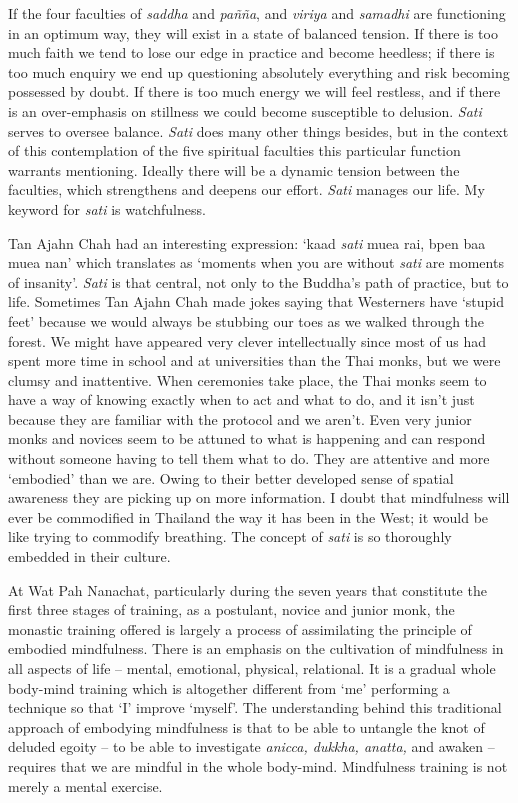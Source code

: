 If the four faculties of \emph{saddha} and \emph{pañña}, and
\emph{viriya} and \emph{samadhi} are functioning in an optimum way, they
will exist in a state of balanced tension. If there is too much faith we
tend to lose our edge in practice and become heedless; if there is too
much enquiry we end up questioning absolutely everything and risk
becoming possessed by doubt. If there is too much energy we will feel
restless, and if there is an over-emphasis on stillness we could become
susceptible to delusion. \emph{Sati} serves to oversee balance.
\emph{Sati} does many other things besides, but in the context of this
contemplation of the five spiritual faculties this particular function
warrants mentioning. Ideally there will be a dynamic tension between the
faculties, which strengthens and deepens our effort. \emph{Sati} manages
our life. My keyword for \emph{sati} is watchfulness.

Tan Ajahn Chah had an interesting expression: `kaad \emph{sati} muea rai,
bpen baa muea nan' which translates as `moments when you are without
\emph{sati} are moments of insanity'. \emph{Sati} is that central, not
only to the Buddha's path of practice, but to life. Sometimes Tan Ajahn
Chah made jokes saying that Westerners have `stupid feet' because we
would always be stubbing our toes as we walked through the forest. We
might have appeared very clever intellectually since most of us had
spent more time in school and at universities than the Thai monks, but
we were clumsy and inattentive.
When ceremonies take place, the Thai monks seem to have a way of knowing exactly
when to act and what to do, and it isn't just because they are familiar with the
protocol and we aren't. Even very junior monks and novices seem to be attuned to
what is happening and can respond without someone having to tell them what to
do. They are attentive and more `embodied' than we are. Owing to their better
developed sense of spatial awareness they are picking up on more information.
I doubt that mindfulness will ever
be commodified in Thailand the way it has been in the West; it would be
like trying to commodify breathing. The concept of \emph{sati} is so
thoroughly embedded in their culture.

At Wat Pah Nanachat, particularly during the seven years that constitute
the first three stages of training, as a postulant, novice and junior
monk, the monastic training offered is largely a process of assimilating
the principle of embodied mindfulness. There is an emphasis on the
cultivation of mindfulness in all aspects of life -- mental, emotional,
physical, relational. It is a gradual whole body-mind training which is
altogether different from `me' performing a technique so that `I'
improve `myself'. The understanding behind this traditional approach of
embodying mindfulness is that to be able to untangle the knot of deluded
egoity -- to be able to investigate \emph{anicca, dukkha, anatta,} and
awaken -- requires that we are mindful in the whole body-mind.
Mindfulness training is not merely a mental exercise.

